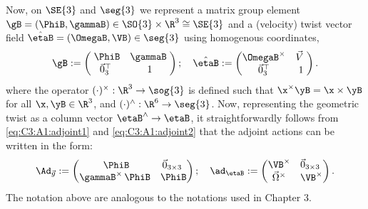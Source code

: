 %
Now, on $\SE{3}$ and $\seg{3}$ we represent a matrix group element $\gB = (\PhiB, \gammaB) \in  \SO{3} \times \R^3 \cong \SE{3}$ and a (velocity) twist vector field $\hat{\etaB} = (\OmegaB,\VB) \in \seg{3}$ using homogenous coordinates,
%
\begin{align}
    \gB  := 
    \begin{pmatrix}
    \; {\PhiB} & \gammaB \; \\
    \vec{0}_3^\top & 1
    \end{pmatrix}; \quad
    \hat{\etaB} := 
    \begin{pmatrix}
    \OmegaB^{\times} & \vec{V} \; \\
    \vec{0}_3^\top & 1
    \end{pmatrix}.
\end{align}
%
where the operator $(\cdot)^{\times}:\R^3 \to \sog{3}$ is defined such that $\x^\times\yB = \x \times \yB$ for all $\x,\yB \in \R^3$, and $(\cdot)^\wedge:\R^6 \to \seg{3}$. Now, representing the geometric twist as a column vector $\etaB^\wedge \to \etaB$, it straightforwardly follows from \eqref{eq:C3:A1:adjoint1} and \eqref{eq:C3:A1:adjoint2} that the adjoint actions can be written in the form:
%
\begin{align}
    \Ad_{\vec{g}}  := 
    \begin{pmatrix}
    \; {\PhiB} & \vec{0}_{3\times3} \; \\
    \gammaB^{\times}\,{\PhiB} & {\PhiB}
    \end{pmatrix}; \quad
    \ad_{\etaB}  := 
    \begin{pmatrix}
    \VB^{\times} & \vec{0}_{3\times3} \; \\
    \vec{\Omega}^{\times} & \VB^{\times} 
    \end{pmatrix}.
\end{align}
The notation above are analogous to the notations used in Chapter 3. \\ \vspace{-3mm}

